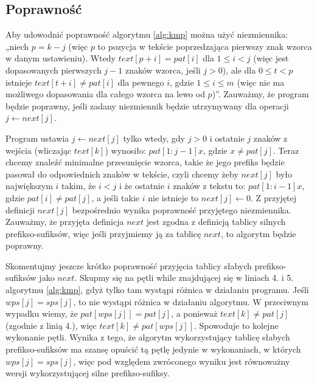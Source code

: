 \subsection{Poprawność}
Aby udowodnić poprawność algorytmu \ref{alg:kmp} można użyć niezmiennika: „niech $p = k - j$ (więc $p$ to pozycja w tekście poprzedzająca pierwszy znak wzorca w danym ustawieniu). Wtedy $text[p+i] = pat[i]$ dla $1 \leq i < j$ (więc jest dopasowanych pierwszych $j - 1$ znaków wzorca, jeśli $j > 0$), ale dla $0 \leq t < p$ istnieje $text[t+i] \neq pat[i]$ dla pewnego $i$, gdzie $1 \leq i \leq m$ (więc nie ma możliwego dopasowania dla całego wzorca na lewo od $p$)”. Zauważmy, że program będzie poprawny, jeśli zadany niezmiennik będzie utrzymywany dla operacji $j \gets next[j]$. 

Program ustawia $j \gets next[j]$ tylko wtedy, gdy $j > 0$ i ostatnie $j$ znaków z wejścia (wliczając $text[k]$) wynosiło: $pat[1:j-1]x$, gdzie $x \neq pat[j]$. Teraz chcemy znaleźć minimalne przesunięcie wzorca, takie że jego prefiks będzie pasował do odpowiednich znaków w tekście, czyli chcemy żeby $next[j]$ było największym $i$ takim, że $i < j$ i że ostatnie $i$ znaków z tekstu to: $pat[1:i-1]x$, gdzie $pat[i] \neq pat[j]$, a jeśli takie $i$ nie istnieje to $next[j] \gets 0$. Z przyjętej definicji $next[j]$ bezpośrednio wynika poprawność przyjętego niezmiennika. Zauważmy, że przyjęta definicja $next$ jest zgodna z definicją tablicy silnych prefikso-sufiksów, więc jeśli przyjmiemy ją za tablicę $next$, to algorytm będzie poprawny. 

Skomentujmy jeszcze krótko poprawność przyjęcia tablicy słabych prefikso-sufiksów jako $next$. Skupmy się na pętli while znajdującej się w liniach 4. i 5. algorytmu \ref{alg:kmp}, gdyż tylko tam wystąpi różnica w działaniu programu. Jeśli $wps[j] = sps[j]$, to nie wystąpi różnica w działaniu algorytmu. W przeciwnym wypadku wiemy, że $pat[wps[j]] = pat[j]$, a ponieważ $text[k] \neq pat[j]$ (zgodnie z linią 4.), więc $text[k] \neq pat[wps[j]]$. Spowoduje to kolejne wykonanie pętli. Wynika z tego, że algorytm wykorzystujący tablicę słabych prefikso-sufiksów ma szansę opuścić tą pętlę jedynie w wykonaniach, w których $wps[j] = sps[j]$, więc pod względem zwróconego wyniku jest równoważny wersji wykorzystującej silne prefikso-sufiksy.



